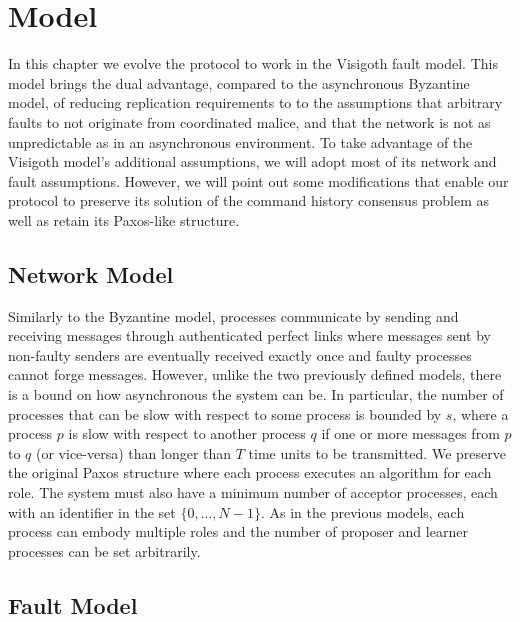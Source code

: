 \section{Model} \label{vft_model}
In this chapter we evolve the protocol to work in the Visigoth fault model. This model brings the dual advantage, compared to the asynchronous Byzantine model, of reducing replication requirements to to the assumptions that arbitrary faults to not originate from coordinated malice, and that the network is not as unpredictable as in an asynchronous environment. To take advantage of the Visigoth model's additional assumptions, we will adopt most of its network and fault assumptions. However, we will point out some modifications that enable our protocol to preserve its solution of the command history consensus problem as well as retain its Paxos-like structure. 

\subsection{Network Model}

Similarly to the Byzantine model, processes communicate by sending and receiving messages through authenticated perfect links where messages sent by non-faulty senders are eventually received exactly once and faulty processes cannot forge messages. However, unlike the two previously defined models, there is a bound on how asynchronous the system can be. In particular, the number of processes that can be slow with respect to some process is bounded by $s$, where a process $p$ is slow with respect to another process $q$ if one or more messages from $p$ to $q$ (or vice-versa) than longer than $T$ time units to be transmitted. We preserve the original Paxos structure where each process executes an algorithm for each role. The system must also have a minimum number of acceptor processes, each with an identifier in the set $\{0,...,N-1\}$. As in the previous models, each process can embody multiple roles and the number of proposer and learner processes can be set arbitrarily.

\subsection{Fault Model}

